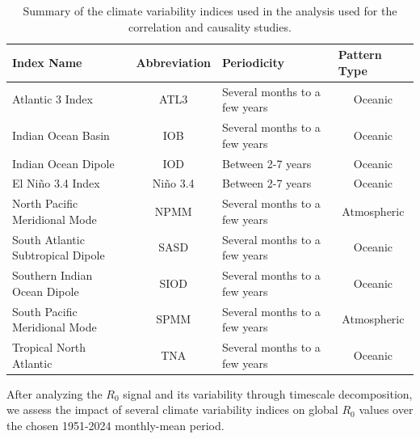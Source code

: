 \documentclass[10pt,twocolumn]{wlscirep}
\begin{document}
\begin{table}[t]
  \centering
  \begin{tabular}{l|c|l|c}
    \textbf{Index Name}               & \multicolumn{1}{l|}{\textbf{Abbreviation}} & \textbf{Periodicity}          & \multicolumn{1}{l|}{\textbf{Pattern Type}} \\ \hline
    Atlantic 3 Index                  & ATL3                                       & Several months to a few years & Oceanic                                    \\
    Indian Ocean Basin                & IOB                                        & Several months to a few years & Oceanic                                    \\
    Indian Ocean Dipole               & IOD                                        & Between 2-7 years             & Oceanic                                    \\
    El Niño 3.4 Index                 & Niño 3.4                                   & Between 2-7 years             & Oceanic                                    \\
    North Pacific Meridional Mode     & NPMM                                       & Several months to a few years & Atmospheric                                \\
    South Atlantic Subtropical Dipole & SASD                                       & Several months to a few years & Oceanic                                    \\
    Southern Indian Ocean Dipole      & SIOD                                       & Several months to a few years & Oceanic                                    \\
    South Pacific Meridional Mode     & SPMM                                       & Several months to a few years & Atmospheric                                \\
    Tropical North Atlantic           & TNA                                        & Several months to a few years & Oceanic
  \end{tabular}%
  \caption{Summary of the climate variability indices used in the analysis used for the correlation and causality studies.}
  \label{tab:climate-variability-indices}
\end{table}
After analyzing the $R_0$ signal and its variability through timescale decomposition, we assess the impact of several climate variability indices on global $R_0$ values over the chosen 1951-2024 monthly-mean period.
\end{document}
